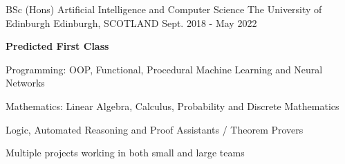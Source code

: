 \begin{cventries}
  \cventry
    {BSc (Hons) Artificial Intelligence and Computer Science} %
    {The University of Edinburgh} %
    {Edinburgh, SCOTLAND} %
    {Sept. 2018 - May 2022} %
    {
        \textbf{Predicted First Class}
        \vspace{1.35em}
        \begin{cvitems} %
            \item Programming: OOP, Functional, Procedural Machine Learning and Neural Networks
            \item Mathematics: Linear Algebra, Calculus, Probability and Discrete Mathematics
            \item Logic, Automated Reasoning and Proof Assistants / Theorem  Provers
            \item Multiple projects working in both small and large teams
        \end{cvitems}
    }
\end{cventries}
